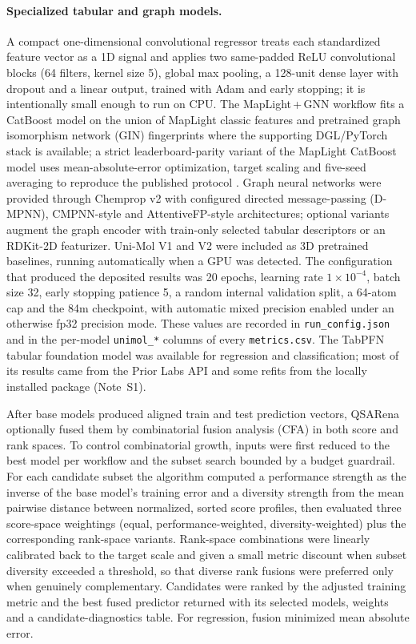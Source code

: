 \documentclass[11pt,a4paper]{article}
\begin{document}
\paragraph{Specialized tabular and graph models.} A compact one-dimensional convolutional regressor treats each standardized feature vector as a 1D signal and applies two same-padded ReLU convolutional blocks (64 filters, kernel size 5), global max pooling, a 128-unit dense layer with dropout and a linear output, trained with Adam and early stopping; it is intentionally small enough to run on CPU. The MapLight\,+\,GNN workflow fits a CatBoost model on the union of MapLight classic features and pretrained graph isomorphism network (GIN) fingerprints where the supporting DGL/PyTorch stack is available; a strict leaderboard-parity variant of the MapLight CatBoost model uses mean-absolute-error optimization, target scaling and five-seed averaging to reproduce the published protocol \cite{notwell2023admet}. Graph neural networks were provided through Chemprop v2 \cite{yang2019analyzing,heid2024chemprop,graff2026chempropv2} with configured directed message-passing (D-MPNN), CMPNN-style and AttentiveFP-style architectures; optional variants augment the graph encoder with train-only selected tabular descriptors or an RDKit-2D featurizer. Uni-Mol V1 and V2 \cite{zhou2023unimol,ji2024unimol2} were included as 3D pretrained baselines, running automatically when a GPU was detected. The configuration that produced the deposited results was 20 epochs, learning rate $1\times10^{-4}$, batch size 32, early stopping patience 5, a random internal validation split, a 64-atom cap and the 84m checkpoint, with automatic mixed precision enabled under an otherwise fp32 precision mode. These values are recorded in \texttt{run\_config.json} and in the per-model \texttt{unimol\_*} columns of every \texttt{metrics.csv}. The TabPFN tabular foundation model \cite{hollmann2023tabpfn} was available for regression and classification; most of its results came from the Prior Labs API and some refits from the locally installed package (Note~S1).

After base models produced aligned train and test prediction vectors, QSARena optionally fused them by combinatorial fusion analysis (CFA) \cite{hsu2006combinatorial} in both score and rank spaces. To control combinatorial growth, inputs were first reduced to the best model per workflow and the subset search bounded by a budget guardrail. For each candidate subset the algorithm computed a performance strength as the inverse of the base model's training error and a diversity strength from the mean pairwise distance between normalized, sorted score profiles, then evaluated three score-space weightings (equal, performance-weighted, diversity-weighted) plus the corresponding rank-space variants. Rank-space combinations were linearly calibrated back to the target scale and given a small metric discount when subset diversity exceeded a threshold, so that diverse rank fusions were preferred only when genuinely complementary. Candidates were ranked by the adjusted training metric and the best fused predictor returned with its selected models, weights and a candidate-diagnostics table. For regression, fusion minimized mean absolute error.
\end{document}
